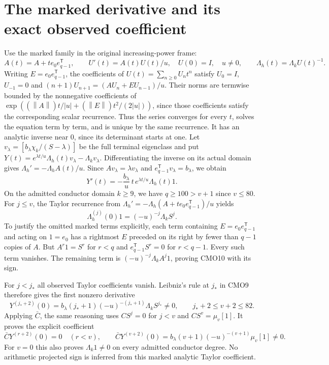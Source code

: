 \documentclass[11pt]{article}
\newcommand{\norm}[1]{\left\lVert#1\right\rVert}
\begin{document}
\section{The marked derivative and its exact observed coefficient}
Use the marked family in the original increasing-power frame:
\[
 A(t)=A+t e_0e_{q-1}^{\mathsf T},\qquad
 U'(t)=A(t)U(t)/u,\quad U(0)=I,\quad u\ne0,
 \qquad \Lambda_h(t)=\Lambda_kU(t)^{-1}.
\]
Writing $E=e_0e_{q-1}^{\mathsf T}$, the coefficients of
$U(t)=\sum_{n\ge0}U_nt^n$ satisfy $U_0=I$, $U_{-1}=0$ and
$(n+1)U_{n+1}=(AU_n+EU_{n-1})/u$.
Their norms are termwise bounded by the nonnegative coefficients
of $\exp((\norm A)t/|u|+(\norm E)t^2/(2|u|))$, since those
coefficients satisfy the corresponding scalar recurrence.
Thus the series converges for every $t$, solves the equation
term by term, and is unique by the same recurrence.
It has an analytic inverse near $0$, since its determinant
starts at one.
Let $v_\lambda=[b_\lambda\chi_k/(S-\lambda)]$ be the full
terminal eigenclass and put
$Y(t)=e^{\lambda t/u}\Lambda_h(t)v_\lambda-\Lambda_kv_\lambda$.
Differentiating the inverse on its actual domain gives
$\Lambda_h'=-\Lambda_h A(t)/u$.
Since $Av_\lambda=\lambda v_\lambda$ and
$e_{q-1}^{\mathsf T}v_\lambda=b_\lambda$, we obtain
\begin{equation}\tag{CMO9}
 Y'(t)=-\frac{b_\lambda}{u}\,t\,e^{\lambda t/u}
                               \Lambda_h(t)1 .
\end{equation}
On the admitted conductor domain $k\ge9$, we have
$q\ge100>v+1$ since $v\le80$.
For $j\le v$, the Taylor recurrence from
$\Lambda_h'=-\Lambda_h(A+t e_0e_{q-1}^{\mathsf T})/u$ yields
\begin{equation}\tag{CMO10}
 \Lambda_h^{(j)}(0)1=(-u)^{-j}\Lambda_kS^j.
\end{equation}
To justify the omitted marked terms explicitly, each term
containing $E=e_0e_{q-1}^{\mathsf T}$ and acting on $1=e_0$
has a rightmost $E$ preceded on its right by fewer than $q-1$
copies of $A$. But $A^r1=S^r$ for $r<q$ and
$e_{q-1}^{\mathsf T}S^r=0$ for $r<q-1$.
Every such term vanishes. The remaining term is
$(-u)^{-j}\Lambda_kA^j1$, proving CMO10 with its sign.

For $j<j_*$ all observed Taylor coefficients vanish.
Leibniz's rule at $j_*$ in CMO9 therefore gives the first
nonzero derivative
\begin{equation}\tag{CMO11}
 \boxed{Y^{(j_*+2)}(0)
 =b_\lambda(j_*+1)(-u)^{-(j_*+1)}\Lambda_kS^{j_*}\ne0,
 \qquad j_*+2\le v+2\le82.}
\end{equation}
Applying $\bar C$, the same reasoning uses $CS^j=0$ for
$j<v$ and $CS^v=\mu_v[1]$. It proves the explicit coefficient
\begin{equation}\tag{CMO12}
 \bar C Y^{(r+2)}(0)=0\quad(r<v),\qquad
 \boxed{\bar C Y^{(v+2)}(0)
 =b_\lambda(v+1)(-u)^{-(v+1)}\mu_v[1]\ne0.}
\end{equation}
For $v=0$ this also proves $\Lambda_k1\ne0$ on every
admitted conductor degree. No arithmetic projected sign is
inferred from this marked analytic Taylor coefficient.
\end{document}
